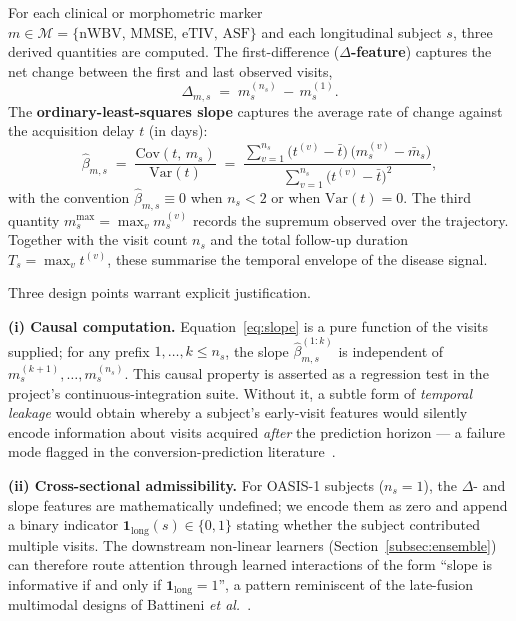 For each clinical or morphometric marker $m \in \mathcal{M} = \{\mathrm{nWBV},\, \mathrm{MMSE},\, \mathrm{eTIV},\, \mathrm{ASF}\}$ and each longitudinal subject $s$, three derived quantities are computed. The first-difference (\textbf{$\Delta$-feature}) captures the net change between the first and last observed visits,
\begin{equation}
\Delta_{m,s} \;=\; m^{(n_s)}_s \,-\, m^{(1)}_s.
\end{equation}
The \textbf{ordinary-least-squares slope} captures the average rate of change against the acquisition delay $t$ (in days):
\begin{equation}
\hat{\beta}_{m,s} \;=\; \frac{\mathrm{Cov}\!\left(t,\, m_s\right)}{\mathrm{Var}\!\left(t\right)} \;=\; \frac{\sum_{v=1}^{n_s} \bigl(t^{(v)} - \bar{t}\bigr)\,\bigl(m_s^{(v)} - \bar{m}_s\bigr)}{\sum_{v=1}^{n_s} \bigl(t^{(v)} - \bar{t}\bigr)^{2}},
\label{eq:slope}
\end{equation}
with the convention $\hat{\beta}_{m,s} \equiv 0$ when $n_s < 2$ or when $\mathrm{Var}(t) = 0$. The third quantity $m^{\max}_s = \max_{v} m_s^{(v)}$ records the supremum observed over the trajectory. Together with the visit count $n_s$ and the total follow-up duration $T_s = \max_v t^{(v)}$, these summarise the temporal envelope of the disease signal.

Three design points warrant explicit justification.

\textbf{(i) Causal computation.} Equation~\eqref{eq:slope} is a pure function of the visits supplied; for any prefix $1, \ldots, k \le n_s$, the slope $\hat{\beta}_{m,s}^{(1:k)}$ is independent of $m_s^{(k+1)}, \ldots, m_s^{(n_s)}$. This causal property is asserted as a regression test in the project's continuous-integration suite. Without it, a subtle form of \emph{temporal leakage} would obtain whereby a subject's early-visit features would silently encode information about visits acquired \emph{after} the prediction horizon --- a failure mode flagged in the conversion-prediction literature~\cite{moradi2015}.

\textbf{(ii) Cross-sectional admissibility.} For OASIS-1 subjects ($n_s = 1$), the $\Delta$- and slope features are mathematically undefined; we encode them as zero and append a binary indicator $\mathbf{1}_{\mathrm{long}}(s) \in \{0,1\}$ stating whether the subject contributed multiple visits. The downstream non-linear learners (Section~\ref{subsec:ensemble}) can therefore route attention through learned interactions of the form ``slope is informative if and only if $\mathbf{1}_{\mathrm{long}} = 1$'', a pattern reminiscent of the late-fusion multimodal designs of Battineni \emph{et al.}~\cite{battineni2021}.

